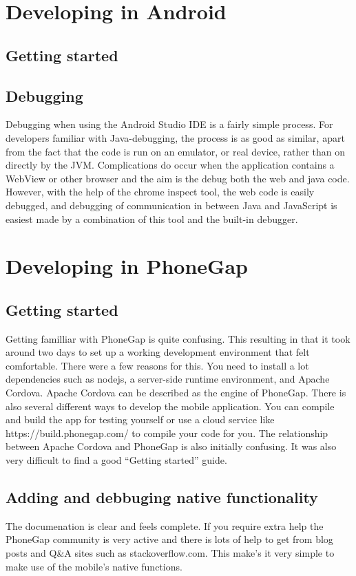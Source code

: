 \iffalse
\section{Developing in Android}
\subsection{Getting started}
\subsection{Debugging}
Debugging when using the Android Studio IDE is a fairly simple process. For developers familiar with Java-debugging, the process is as good as similar, apart from the fact that the code is run on an emulator, or real device, rather than on directly by the JVM. Complications do occur when the application contains a WebView or other browser and the aim is the debug both the web and java code. However, with the help of the chrome inspect tool, the web code is easily debugged, and debugging of communication in between Java and JavaScript is easiest made by a combination of this tool and the built-in debugger. 
\section{Developing in PhoneGap}
\subsection{Getting started}
Getting familliar with PhoneGap is quite confusing. This resulting in that it took around two days to set up a working development environment that felt comfortable. There were a few reasons for this. You need to install a lot dependencies such as nodejs, a server-side runtime environment, and Apache Cordova. Apache Cordova can be described as the engine of PhoneGap. There is also several different ways to develop the mobile application. You can compile and build the app for testing yourself or use a cloud service like https://build.phonegap.com/ to compile your code for you. The relationship between Apache Cordova and PhoneGap is also initially confusing. It was also very difficult to find a good “Getting started” guide.

\subsection{Adding and debbuging native functionality}
The documenation is clear and feels complete. If you require extra help the PhoneGap community is very active and there is lots of help to get from blog posts and Q\&A sites such as stackoverflow.com. This make’s it very simple to make use of the mobile’s native functions. 

